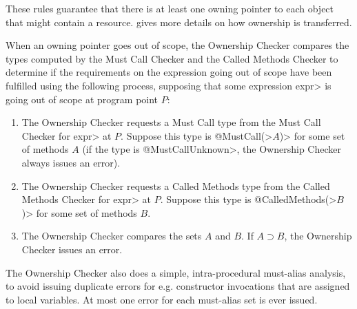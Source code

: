These rules guarantee that there is at least one owning pointer to each
object that might contain a resource. 
gives more details on how ownership is transferred.

When an owning pointer goes out of scope, the Ownership Checker
compares the types computed by the Must Call Checker and the Called
Methods Checker to determine if the requirements on the expression
going out of scope have been fulfilled using the following process,
supposing that some expression \<expr> is going out of scope at
program point $P$:
\begin{enumerate}
  \item The Ownership Checker requests a Must Call type from the Must
    Call Checker for \<expr> at $P$. Suppose this type is
    \<@MustCall(>$A$\<)> for some set of methods $A$ (if the type is
    \<@MustCallUnknown>, the Ownership Checker always issues an
    error).
  \item The Ownership Checker requests a Called Methods type from the
    Called Methods Checker for \<expr> at $P$. Suppose this type is
    \<@CalledMethods(>$B$\<)> for some set of methods $B$.
  \item The Ownership Checker compares the sets $A$ and $B$. If
    $A \supset B$, the Ownership Checker issues an error.
\end{enumerate}

The Ownership Checker also does a simple, intra-procedural must-alias
analysis, to avoid issuing duplicate errors for e.g. constructor
invocations that are assigned to local variables. At most one error
for each must-alias set is ever issued. 
